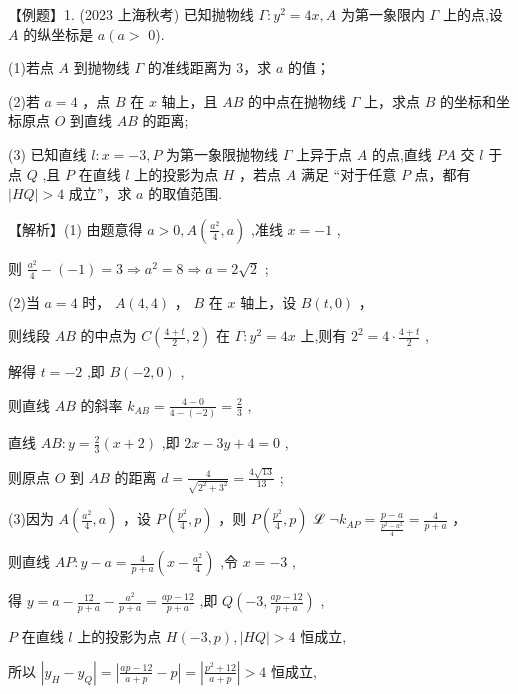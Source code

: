\documentclass[10pt]{article}
\begin{document}
【例题】1. (2023 上海秋考) 已知抛物线 \(\Gamma  : {y}^{2} = {4x},A\) 为第一象限内 \(\Gamma\) 上的点,设 \(A\) 的纵坐标是 \(a\left( {a > }\right.\) 0).

(1)若点 \(A\) 到抛物线 \(\Gamma\) 的准线距离为 3，求 \(a\) 的值；

(2)若 \(a = 4\) ，点 \(B\) 在 \(x\) 轴上，且 \({AB}\) 的中点在抛物线 \(\Gamma\) 上，求点 \(B\) 的坐标和坐标原点 \(O\) 到直线 \({AB}\) 的距离;

(3) 已知直线 \(l : x =  - 3,P\) 为第一象限抛物线 \(\Gamma\) 上异于点 \(A\) 的点,直线 \({PA}\) 交 \(l\) 于点 \(Q\) ,且 \(P\) 在直线 \(l\) 上的投影为点 \(H\) ，若点 \(A\) 满足 “对于任意 \(P\) 点，都有 \(\left| {HQ}\right|  > 4\) 成立”，求 \(a\) 的取值范围.

【解析】(1) 由题意得 \(a > 0,A\left( {\frac{{a}^{2}}{4},a}\right)\) ,准线 \(x =  - 1\) ,

则 \(\frac{{a}^{2}}{4} - \left( {-1}\right)  = 3 \Rightarrow  {a}^{2} = 8 \Rightarrow  a = 2\sqrt{2}\) ;

(2)当 \(a = 4\) 时， \(A\left( {4,4}\right)\) ， \(B\) 在 \(x\) 轴上，设 \(B\left( {t,0}\right)\) ，

则线段 \({AB}\) 的中点为 \(C\left( {\frac{4 + t}{2},2}\right)\) 在 \(\Gamma  : {y}^{2} = {4x}\) 上,则有 \({2}^{2} = 4 \cdot  \frac{4 + t}{2}\) ,

解得 \(t =  - 2\) ,即 \(B\left( {-2,0}\right)\) ,

则直线 \({AB}\) 的斜率 \({k}_{AB} = \frac{4 - 0}{4 - \left( {-2}\right) } = \frac{2}{3}\) ,

直线 \({AB} : y = \frac{2}{3}\left( {x + 2}\right)\) ,即 \({2x} - {3y} + 4 = 0\) ,

则原点 \(O\) 到 \({AB}\) 的距离 \(d = \frac{4}{\sqrt{{2}^{2} + {3}^{2}}} = \frac{4\sqrt{13}}{13}\) ;

(3)因为 \(A\left( {\frac{{a}^{2}}{4},a}\right)\) ，设 \(P\left( {\frac{{p}^{2}}{4},p}\right)\) ，则 \(P\left( {\frac{{p}^{2}}{4},p}\right)\) ℒ \(\neg {k}_{AP} = \frac{p - a}{\frac{{p}^{2} - {a}^{2}}{4}} = \frac{4}{p + a}\) ，

则直线 \({AP} : y - a = \frac{4}{p + a}\left( {x - \frac{{a}^{2}}{4}}\right)\) ,令 \(x =  - 3\) ,

得 \(y = a - \frac{12}{p + a} - \frac{{a}^{2}}{p + a} = \frac{{ap} - {12}}{p + a}\) ,即 \(Q\left( {-3,\frac{{ap} - {12}}{p + a}}\right)\) ,

\(P\) 在直线 \(l\) 上的投影为点 \(H\left( {-3,p}\right) ,\left| {HQ}\right|  > 4\) 恒成立,

所以 \(\left| {{y}_{H} - {y}_{Q}}\right|  = \left| {\frac{{ap} - {12}}{a + p} - p}\right|  = \left| \frac{{p}^{2} + {12}}{a + p}\right|  > 4\) 恒成立,
\end{document}
